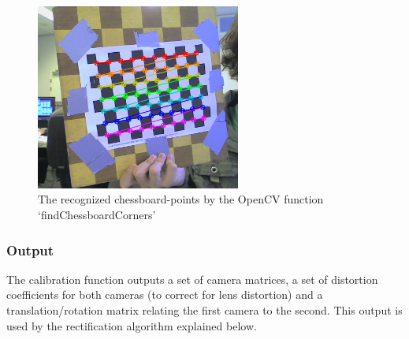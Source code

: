 \documentclass[a4paper]{article}
\begin{document}
\begin{figure} [h!tb]
\centering
  \includegraphics[width=0.6\textwidth]{chessboardcorners}
  \caption{The recognized chessboard-points by the OpenCV function
`findChessboardCorners'\label{chessboardcorners}}
\end{figure}

\subsubsection{Output} The calibration function outputs a set of
camera matrices, a set of distortion coefficients for both cameras (to
correct for lens distortion) and a translation/rotation matrix
relating the first camera to the second. This output is used by the
rectification algorithm explained below.
\end{document}
